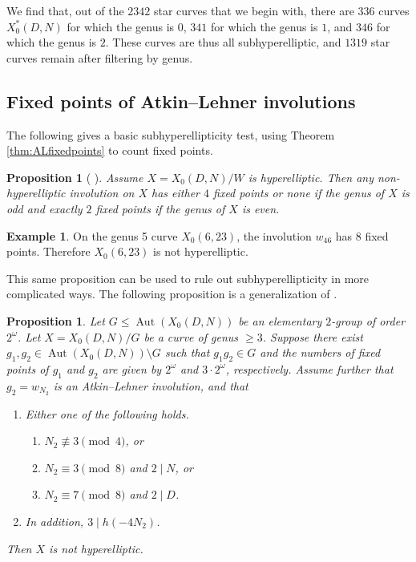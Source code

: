 \documentclass[12pt]{amsart}
\DeclareMathOperator{\Aut}{Aut}
\numberwithin{equation}{subsection}
\theoremstyle{plain}\newtheorem{ithm}{Theorem}
\theoremstyle{plain}\newtheorem{iprop}[ithm]{Proposition}
\newtheorem{proposition}[equation]{Proposition}
\theoremstyle{definition}
\newtheorem{example}[equation]{Example}
\theoremstyle{remark}
\newcommand{\Curve}[2]{X_0({#1},{#2})} %
\newcommand{\StarCurve}[2]{X_0^*({#1},{#2})} %
\begin{document}
We find that, out of the $2342$ star curves that we begin with, there are $336$ curves $\StarCurve{D}{N}$ for which the genus is $0$, $341$ for which the genus is $1$, and $346$ for which the genus is $2$. These curves are thus all subhyperelliptic, and $1319$ star curves remain after filtering by genus.



\subsection{Fixed points of Atkin--Lehner involutions}
\label{sec:fixedpointsAL}
The following gives a basic subhyperellipticity test, using Theorem \ref{thm:ALfixedpoints} to count fixed points.
\begin{proposition}[{\cite[Proposition 1]{OggHyperelliptic}} ]
\label{prop:fixedpointsAL}
 Assume $X = \Curve{D}{N}/W$ is hyperelliptic. Then any non-hyperelliptic involution on $X$ has either $4$ fixed points or none if the genus of $X$ is odd and exactly $2$ fixed points if the genus of $X$ is even.
\end{proposition}
\begin{example}
On the genus 5 curve $\Curve{6}{23}$, the involution $w_{46}$ has 8 fixed points. Therefore $\Curve{6}{23}$ is not hyperelliptic.
\end{example}

This same proposition can be used to rule out subhyperellipticity in more complicated ways. The following proposition is a generalization of \cite[Proposition 6]{FH99}.

\begin{proposition}
\label{prop:complicatedAL}
Let $G \le \Aut(\Curve{D}{N})$ be an elementary $2$-group of order $2^\omega$. Let $X = \Curve{D}{N}/G$ be a curve of genus $\ge 3$. Suppose there exist $g_1, g_2 \in \Aut(X_0(D,N)) \setminus G$ such that $g_1 g_2 \in G$ and the numbers of fixed points of $g_1$ and $g_2$ are given by $2^{\omega}$ and $3 \cdot 2^{\omega}$, respectively. Assume further that $g_2 = w_{N_2}$ is an Atkin--Lehner involution, and that
\begin{enumerate}
\item Either one of the following holds. \label{item:N2 congruence}
\begin{enumerate}
    \item $N_2 \not\equiv 3 \pmod 4$, or
    \item $N_2 \equiv 3 \pmod 8$ and $2 \mid N$, or \label{item:3 mod 8}
    \item $N_2 \equiv 7 \pmod 8$ and $2 \mid D$. \label{item:7 mod 8}
\end{enumerate}
\item In addition, $3 \mid h(-4 N_2)$. \label{item:class number}
\end{enumerate}
Then $X$ is not hyperelliptic.
\end{proposition}
\end{document}
